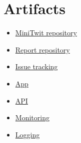 \section{Artifacts}
\begin{itemize}
    \item \href{https://github.com/Dev-ops-Gaming/MiniTwit}{MiniTwit repository}
    \item \href{https://github.com/Dev-ops-Gaming/report}{Report repository}
    \item \href{https://github.com/Dev-ops-Gaming/MiniTwit/issues}{Issue tracking}
    \item \href{http://209.38.176.56:8080/}{App}
    \item \href{http://209.38.176.56:8088/}{API}
    \item \href{http://209.38.176.56:3000/}{Monitoring}
    \item \href{http://209.38.176.56:8088/}{Logging}
\end{itemize}